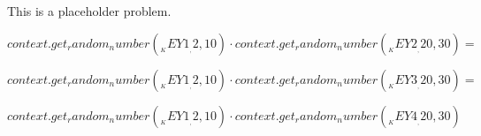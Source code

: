 This is a placeholder problem.
\begin{Problem}
\item ${{context.get_random_number(__KEY1__, 2, 10)}} \cdot {{context.get_random_number(__KEY2__, 20, 30)}} =$
\item ${{context.get_random_number(__KEY1__, 2, 10)}} \cdot {{context.get_random_number(__KEY3__, 20, 30)}} = $ 
\item ${{context.get_random_number(__KEY1__, 2, 10)}} \cdot {{context.get_random_number(__KEY4__, 20, 30)}}$ 
\end{Problem}